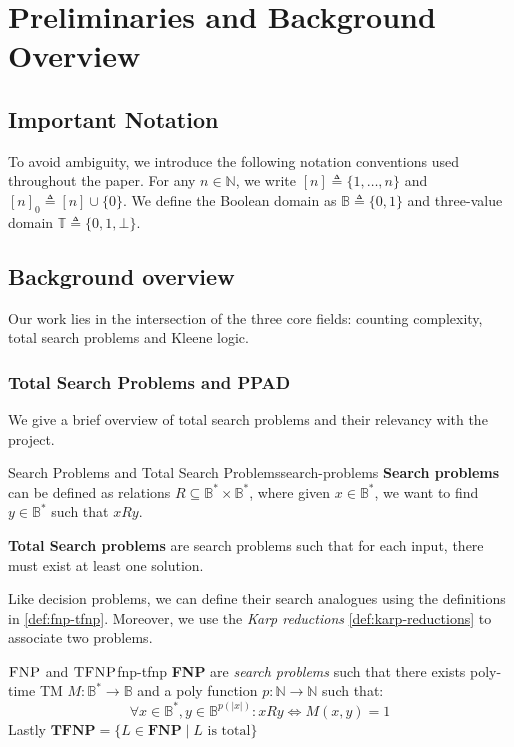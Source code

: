 \section{Preliminaries and Background Overview}

\subsection{Important Notation}

To avoid ambiguity, we introduce the following notation conventions used throughout the paper.
For any \(n \in \mathbb{N}\), we write \([n] \triangleq \{1, \ldots, n\}\)  and \([n]_0 \triangleq [n] \cup \{0\}\).
We define the Boolean domain as \(\mathbb{B} \triangleq \{0, 1\}\) and
three-value domain \(\mathbb{T} \triangleq \{0, 1, \bot\}\).


\subsection{Background overview}

Our work lies in the intersection of the three core fields:
counting complexity, total search problems and Kleene logic.

\subsubsection{Total Search Problems and PPAD}
We give a brief overview of total search problems and their relevancy with the project.

\begin{definitionbox}{Search Problems and Total Search Problems}{search-problems}
	\textbf{Search problems} can be defined as relations $R \subseteq \mathbb{B}^* \times \mathbb{B}^*$,
	where given $x \in \mathbb{B}^*$, we want to find $y \in \mathbb{B}^*$  such that $xRy$.

	\textbf{Total Search problems} are search problems such that for each input, there must exist at least one solution.
\end{definitionbox}

Like decision problems, we can define their search analogues
using the definitions in \ref{def:fnp-tfnp}.
Moreover, we use the \textit{Karp reductions} \ref{def:karp-reductions} to associate
two problems.


\begin{definitionbox}{$\textnormal{\textsc{FNP}}$ and $\textnormal{\textsc{TFNP}}$}{fnp-tfnp}
	\label{def:fnp-tfnp}
	\textbf{FNP} are \textit{search problems} such that there exists poly-time TM $M: \mathbb{B}^* \to \mathbb{B}$
	and a poly function $p : \mathbb{N} \to \mathbb{N}$ such that:
	$$
		\forall x \in \mathbb{B}^*, y \in \mathbb{B}^{p(|x|)}: xRy \iff M(x,y) = 1
	$$
	Lastly $\textbf{TFNP} = \{L \in \textbf{FNP} \mid L \text{ is total}\}$
\end{definitionbox}


